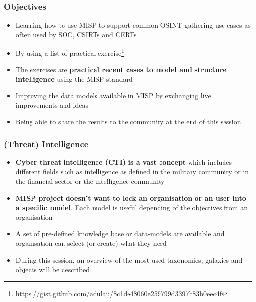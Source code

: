
\begin{frame}[t,plain]
\titlepage
\end{frame}

\begin{frame}
\frametitle{Objectives}
\begin{itemize}
        \item Learning how to use MISP to support common OSINT gathering use-cases as often used by SOC, CSIRTs and CERTs
        \item By using a list of practical exercise\footnote{\url{https://gist.github.com/adulau/8c1de48060e259799d3397b83b0eec4f}}
        \item The exercises are {\bf practical recent cases to model and structure intelligence} using the MISP standard
        \item Improving the data models available in MISP by exchanging live improvements and ideas
        \item Being able to share the results to the community at the end of this session
\end{itemize}
\end{frame}

\begin{frame}
\frametitle{(Threat) Intelligence}
\begin{itemize}
        \item {\bf Cyber threat intelligence (CTI) is a vast concept} which includes different fields such as intelligence as defined in the military community or in the financial sector or the intelligence community
        \item {\bf MISP project doesn't want to lock an organisation or an user into a specific model}. Each model is useful depending of the objectives from an organisation
        \item A set of pre-defined knowledge base or data-models are available and organisation can select (or create) what they need
        \item During this session, an overview of the most used taxonomies, galaxies and objects will be described
\end{itemize}
\end{frame}

